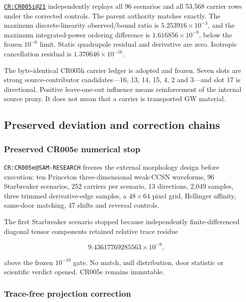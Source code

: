 \href{https://github.com/iwtbotiwtwot/SAMA/blob/4c2b5dc1649da5900c90b90d0ce56c223dbb7717/tests/courtroom/21-gravitational-waves-cr005i-starbreaker-per-carrier-gw-control-appeal-and-freeze/README.md}{\texttt{CR:CR005i@21}}
independently replays all 96 scenarios and all 53,568 carrier rows under
the corrected controls. The parent authority matches exactly. The
maximum discrete-linearity observed/bound ratio is
\(5.253916\times10^{-3}\), and the maximum integrated-power ordering
difference is \(1.616856\times10^{-9}\), below the frozen \(10^{-6}\)
limit. Static quadrupole residual and derivative are zero. Isotropic
cancellation residual is \(1.370646\times10^{-16}\).

The byte-identical CR005h carrier ledger is adopted and frozen. Seven
slots are strong source-contributor candidates---16, 13, 14, 15, 4, 2
and 3---and slot 17 is directional. Positive leave-one-out influence
means reinforcement of the internal source proxy. It does not mean that
a carrier is transported GW material.

\subsection{Preserved deviation and correction
chains}\label{viii-ch08-preserved-deviation-and-correction-chains}

\subsubsection{Preserved CR005e numerical
stop}\label{viii-ch08-preserved-cr005e-numerical-stop}

\texttt{CR:CR005e@SAM-RESEARCH} freezes the external morphology design
before execution: ten Princeton three-dimensional weak-CCSN waveforms,
96 Starbreaker scenarios, 252 carriers per scenario, 13 directions,
2,049 samples, three trimmed derivative-edge samples, a \(48\times64\)
pixel grid, Hellinger affinity, same-door matching, 47 shifts and
reversal controls.

The first Starbreaker scenario stopped because independently
finite-differenced diagonal tensor components retained relative trace
residue

\[
9.43617769285563\times10^{-9},
\]

above the frozen \(10^{-10}\) gate. No match, null distribution, door
statistic or scientific verdict opened. CR005e remains immutable.

\subsubsection{Trace-free projection
correction}\label{viii-ch08-trace-free-projection-correction}

